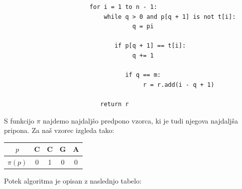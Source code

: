 \documentclass{article}
\begin{document}
\begin{enumerate}
\begin{enumerate}
\begin{verbatim}
						for i = 1 to n - 1:
							while q > 0 and p[q + 1] is not t[i]:
									q = pi

							   if p[q + 1] == t[i]:
									q += 1

								  if q == m:
									   r = r.add(i - q + 1)

						   return r
				\end{verbatim}

				S funkcijo $\pi$ najdemo najdaljšo predpono vzorca, ki je tudi njegova najdaljša
				pripona. Za naš vzorec izgleda tako:

				\begin{center}
					\begin{tabular}{c|c c c c}
						$p$ & C & C & G & A \\
						\hline
						$\pi(p)$ & 0 & 1 & 0 & 0 \\
					\end{tabular}
				\end{center}

				\newpage

				Potek algoritma je opisan z naslednjo tabelo:


\end{enumerate}
\end{enumerate}
\end{document}
